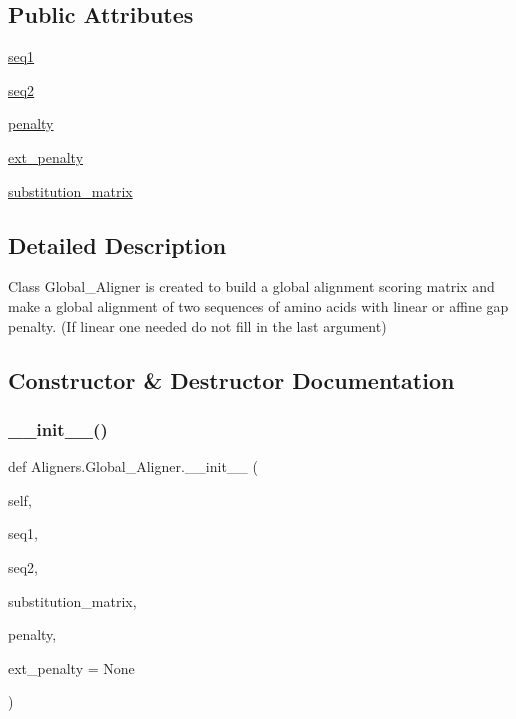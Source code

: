 \subsection*{Public Attributes}
\begin{DoxyCompactItemize}
\item 
\hyperlink{class_aligners_1_1_global___aligner_a04780fa6727d419f44ce9d577b8b651f}{seq1}
\item 
\hyperlink{class_aligners_1_1_global___aligner_a19eaae2895d2246e10543689957a0d36}{seq2}
\item 
\hyperlink{class_aligners_1_1_global___aligner_a2dccafe7e89339e5b1e7354de601c2cb}{penalty}
\item 
\hyperlink{class_aligners_1_1_global___aligner_aa5a4464984be91c2a0407719a1c1a85d}{ext\+\_\+penalty}
\item 
\hyperlink{class_aligners_1_1_global___aligner_a718075378ef694647d0f4c42ecb7adf9}{substitution\+\_\+matrix}
\end{DoxyCompactItemize}


\subsection{Detailed Description}
\begin{DoxyVerb}Class Global_Aligner is created to build a global alignment
scoring matrix and make a global alignment of two sequences
of amino acids with linear or affine gap penalty.
(If linear one needed do not fill in the last argument)
\end{DoxyVerb}
 

\subsection{Constructor \& Destructor Documentation}
\mbox{\label{class_aligners_1_1_global___aligner_a0ee9494eaed0fec52d8c2c1c95fc646d}} 
\subsubsection{\texorpdfstring{\+\_\+\+\_\+init\+\_\+\+\_\+()}{\_\_init\_\_()}}
{\footnotesize\ttfamily def Aligners.\+Global\+\_\+\+Aligner.\+\_\+\+\_\+init\+\_\+\+\_\+ (\begin{DoxyParamCaption}\item[{}]{self,  }\item[{}]{seq1,  }\item[{}]{seq2,  }\item[{}]{substitution\+\_\+matrix,  }\item[{}]{penalty,  }\item[{}]{ext\+\_\+penalty = {\ttfamily None} }\end{DoxyParamCaption})}



